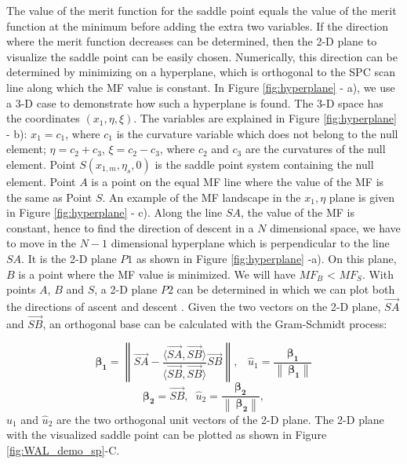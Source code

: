 The value of the merit function for the saddle point equals the value of the merit function at the minimum before adding the extra two variables. If the direction where the merit function decreases can be determined, then the 2-D plane to visualize the saddle point can be easily chosen. Numerically, this direction can be determined by minimizing on a hyperplane, which is orthogonal to the SPC scan line along which the MF value is constant. In Figure \ref{fig:hyperplane} - a), we use a 3-D case to demonstrate how such a hyperplane is found. The 3-D space has the coordinates $(x_1, \eta, \xi)$. The variables are explained in Figure \ref{fig:hyperplane} - b): $x_1 = c_1$, where $c_1$ is the curvature variable which does not belong to the null element; $\eta = c_2 + c_3$, $\xi = c_2 - c_3$, where $c_2$ and $c_3$ are the curvatures of the null element.  Point $S (x_{1,m}, \eta_{s}, 0)$ is the saddle point system containing the null element. Point $A$ is a point on the equal MF line where the value of the MF is the same as Point $S$. An example of the MF landscape in the $x_1, \eta$  plane is given in Figure \ref{fig:hyperplane} - c). Along the line $SA$, the value of the MF is constant, hence to find the direction of descent in a $N$ dimensional space, we have to move in the $N-1$ dimensional hyperplane which is perpendicular to the line $SA$. It is the 2-D plane $P1$ as shown in Figure \ref{fig:hyperplane} -a).  On this plane, $B$ is a point where the MF value is minimized. We will have $MF_{B}$ < $MF_{S}$. With points $A$, $B$ and $S$, a 2-D plane $P2$ can be determined in which we can plot both the directions of ascent and descent . Given the two vectors on the 2-D plane, $\overrightarrow{SA}$ and $\overrightarrow{SB}$, an orthogonal base can be calculated with the Gram-Schmidt process:

\setlength{\belowdisplayshortskip}{5pt}
\setlength{\abovedisplayshortskip}{5pt}
\begin{equation} \label{eq:u1}
\pmb{\beta_{1}} =  \left\| \overrightarrow{SA}-{\frac{\langle \overrightarrow{SA},\overrightarrow{SB}\rangle}{\langle \overrightarrow{SB},\overrightarrow{SB}\rangle}}\overrightarrow{SB} \right\|,  \; \; \; \hat{u}_{1} = \frac{\pmb{\beta_{1}}}{\left\|\ \pmb{\beta_{1}}\right\|}
\end{equation}
\setlength{\belowdisplayshortskip}{10pt}
\begin{equation} \label{eq:u2}
\pmb{\beta_{2}} = \overrightarrow{SB}, \;\; 
\hat{u}_{2} =\frac{\pmb{\beta_{2}}}{\left\|\ \pmb{\beta_{2}}\right\|} ,
\end{equation}
 $\hat{u}_{1}$ and $\hat{u}_{2}$  are the two orthogonal unit vectors of the 2-D plane. The 2-D plane with the visualized saddle point can be plotted as shown in Figure \ref{fig:WAL_demo_sp}-C.

